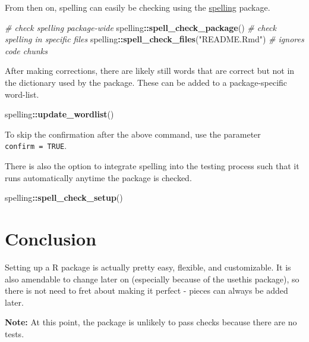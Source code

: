 \documentclass[]{book}
\newenvironment{Shaded}{\begin{snugshade}}{\end{snugshade}}
\newcommand{\CommentTok}[1]{\textcolor[rgb]{0.56,0.35,0.01}{\textit{#1}}}
\newcommand{\KeywordTok}[1]{\textcolor[rgb]{0.13,0.29,0.53}{\textbf{#1}}}
\newcommand{\NormalTok}[1]{#1}
\newcommand{\OperatorTok}[1]{\textcolor[rgb]{0.81,0.36,0.00}{\textbf{#1}}}
\newcommand{\StringTok}[1]{\textcolor[rgb]{0.31,0.60,0.02}{#1}}
\begin{document}
From then on, spelling can easily be checking using the \href{https://github.com/ropensci/spelling}{spelling} package.

\begin{Shaded}
\begin{Highlighting}[]
\CommentTok{# check spelling package-wide}
\NormalTok{spelling}\OperatorTok{::}\KeywordTok{spell_check_package}\NormalTok{()}
\CommentTok{# check spelling in specific files}
\NormalTok{spelling}\OperatorTok{::}\KeywordTok{spell_check_files}\NormalTok{(}\StringTok{"README.Rmd"}\NormalTok{)  }\CommentTok{# ignores code chunks}
\end{Highlighting}
\end{Shaded}

After making corrections, there are likely still words that are correct but not in the dictionary used by the package. These can be added to a package-specific word-list.

\begin{Shaded}
\begin{Highlighting}[]
\NormalTok{spelling}\OperatorTok{::}\KeywordTok{update_wordlist}\NormalTok{()}
\end{Highlighting}
\end{Shaded}

To skip the confirmation after the above command, use the parameter \texttt{confirm\ =\ TRUE}.

There is also the option to integrate spelling into the testing process such that it runs automatically anytime the package is checked.

\begin{Shaded}
\begin{Highlighting}[]
\NormalTok{spelling}\OperatorTok{::}\KeywordTok{spell_check_setup}\NormalTok{()}
\end{Highlighting}
\end{Shaded}

\hypertarget{conclusion}{%
\section{Conclusion}\label{conclusion}}

Setting up a R package is actually pretty easy, flexible, and customizable. It is also amendable to change later on (especially because of the usethis package), so there is not need to fret about making it perfect - pieces can always be added later.

\textbf{Note:} At this point, the package is unlikely to pass checks because there are no tests.
\end{document}
